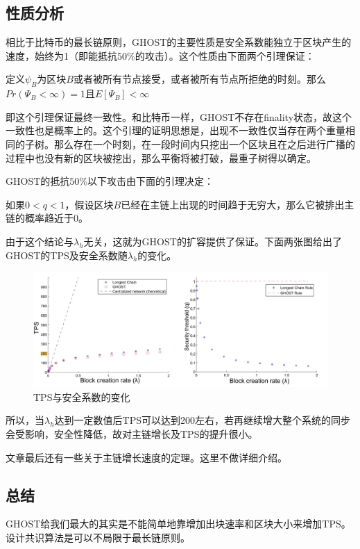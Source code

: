 \subsection{性质分析}
相比于比特币的最长链原则，GHOST的主要性质是安全系数能独立于区块产生的速度，始终为1（即能抵抗$50\%$的攻击）。这个性质由下面两个引理保证：
\begin{lemma}
	定义$\psi_B$为区块$B$或者被所有节点接受，或者被所有节点所拒绝的时刻。那么$Pr(\Psi_B<\infty)=1$且$E[\Psi_B]<\infty$
\end{lemma}
即这个引理保证最终一致性。和比特币一样，GHOST不存在finality状态，故这个一致性也是概率上的。这个引理的证明思想是，出现不一致性仅当存在两个重量相同的子树。那么存在一个时刻，在一段时间内只挖出一个区块且在之后进行广播的过程中也没有新的区块被挖出，那么平衡将被打破，最重子树得以确定。

GHOST的抵抗$50\%$以下攻击由下面的引理决定：
\begin{lemma}
	如果$0<q<1$，假设区块$B$已经在主链上出现的时间趋于无穷大，那么它被排出主链的概率趋近于0。
\end{lemma}
由于这个结论与$\lambda_h$无关，这就为GHOST的扩容提供了保证。下面两张图给出了GHOST的TPS及安全系数随$\lambda_h$的变化。

\begin{figure}
	\centering
	\includegraphics[width=1\textwidth]{../common/GHOST_2.png}
	\caption{TPS与安全系数的变化} 
	\label{fig:GHOST2}
\end{figure}

所以，当$\lambda_h$达到一定数值后TPS可以达到200左右，若再继续增大整个系统的同步会受影响，安全性降低，故对主链增长及TPS的提升很小。

文章最后还有一些关于主链增长速度的定理。这里不做详细介绍。
\subsection{总结}
GHOST给我们最大的其实是不能简单地靠增加出块速率和区块大小来增加TPS。设计共识算法是可以不局限于最长链原则。


	

